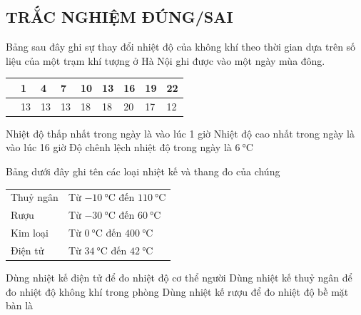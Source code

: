 \subsection{TRẮC NGHIỆM ĐÚNG/SAI}
\setcounter{ex}{0}
\begin{ex}
		Bảng sau đây ghi sự thay đổi nhiệt độ của không khí theo thời gian dựa trên số liệu của một trạm khí tượng ở Hà Nội ghi được vào một ngày mùa đông.
	\begin{center}
		\begin{tabular}{|C{8em}|C{1.5em}|C{1.5em}|C{1.5em}|C{1.5em}|C{1.5em}|C{1.5em}|C{1.5em}|C{1.5em}|}
			\hline
			& 1 & 4 & 7 & 10 & 13 & 16 & 19 & 22\\
			\hline
			 & 13 & 13 &13 & 18& 18 & 20 & 17 & 12\\
			\hline
		\end{tabular}
	\end{center}
	{Nhiệt độ thấp nhất trong ngày là vào lúc 1 giờ}
	{\True Nhiệt độ cao nhất trong ngày là vào lúc 16 giờ}
	{Độ chênh lệch nhiệt độ trong ngày là $\SI{6}{\celsius}$}
\end{ex}
\begin{ex}
	Bảng dưới đây ghi tên các loại nhiệt kế và thang đo của chúng
	\begin{center}
		\begin{tabular}{|C{5cm}|C{6cm}|}
			\hline
			 & \\
			\hline
			Thuỷ ngân & Từ $\SI{-10}{\celsius}$ đến $\SI{110}{\celsius}$\\
			\hline
			Rượu & Từ $\SI{-30}{\celsius}$ đến $\SI{60}{\celsius}$\\
			\hline
			Kim loại & Từ $\SI{0}{\celsius}$ đến $\SI{400}{\celsius}$\\
			\hline
			Điện tử & Từ $\SI{34}{\celsius}$ đến $\SI{42}{\celsius}$\\
			\hline
		\end{tabular}
	\end{center}
	{\True Dùng nhiệt kế điện tử để đo nhiệt độ cơ thể người}
	{\True Dùng nhiệt kế thuỷ ngân để đo nhiệt độ không khí trong phòng}
	{Dùng nhiệt kế rượu để đo nhiệt độ bề mặt bàn là}
	\loigiai{}
\end{ex}
